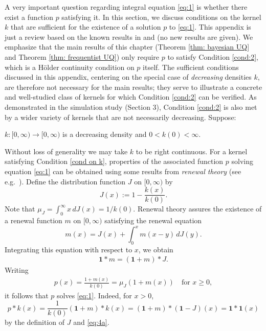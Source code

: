 A very important question regarding integral equation \eqref{eq:1} is whether there exist a function $p$ satisfying it. In this section, we discuss conditions on the kernel $k$ that are sufficient for the existence of a solution $p$ to \eqref{eq:1}. This appendix is just a review based on the known results in \cite{104} and \cite{106} (no new results are given). We emphasize that the main results of this chapter (Theorem \ref{thm: bayesian UQ} and Theorem \ref{thm: frequentist UQ}) only require $p$ to satisfy Condition \ref{cond:2}, which is a H\"{o}lder continuity condition on $p$ itself. The sufficient conditions discussed in this appendix, centering on the special case of \emph{decreasing} densities $k$, are therefore not necessary for the main results; they serve to illustrate a concrete and well-studied class of kernels for which Condition \ref{cond:2} can be verified. As demonstrated in the simulation study (Section 3), Condition \ref{cond:2} is also met by a wider variety of kernels that are not necessarily decreasing. Suppose:
\begin{condition}\label{cond on k}
$k: [0,\infty) \to [0,\infty)$ is a decreasing density and $0 < k(0) < \infty$.
\end{condition}
Without loss of generality we may take $k$ to be right continuous.
For a kernel satisfying Condition \ref{cond on k}, properties of the associated function $p$ solving equation \eqref{eq:1} can be obtained using some results from \emph{renewal theory} (see e.g.\ \cite{105}). Define the distribution function $J$ on $[0,\infty)$ by
\[ J(x) := 1 - \frac{k(x)}{k(0)}. \]
Note that $\mu_J = \int_0^\infty x \, dJ(x) = 1/k(0)$. Renewal theory assures the existence of a renewal function $m$ on $[0,\infty)$ satisfying the renewal equation
\[ m(x) = J(x) + \int_0^x m(x-y) \, dJ(y). \]
Integrating this equation with respect to $x$, we obtain
\begin{align}\label{eq:4a}
\mathbf{1} * m = (\mathbf{1} + m) * J. 
\end{align}
Writing
\begin{align}\label{eq:5a}
	p(x) = \frac{1+m(x)}{k(0)} = \mu_J (1+m(x)) \quad \text{for } x \ge 0, 
\end{align}
it follows that $p$ solves \eqref{eq:1}. Indeed, for $x > 0$,
\[ p * k(x) = \frac{1}{k(0)}(\mathbf{1}+m) * k(x) = (\mathbf{1}+m) * (\mathbf{1}-J)(x) = \mathbf{1} * \mathbf{1}(x) \]
by the definition of $J$ and \eqref{eq:4a}. 

